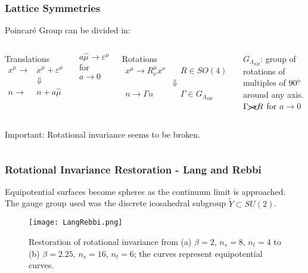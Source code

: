 \documentclass{beamer}
\begin{document}
\begin{frame}
  \frametitle{Lattice Symmetries}
  \centering
{}
  Poincaré Group can be divided in:
  \begin{columns}[t]
    \centering
    \begin{exampleblock}{\centering Translations}
      \vspace{-\baselineskip}
      \begin{align*}
        x^\mu \rightarrow& x^\mu+\varepsilon^\mu \\
        &\Downarrow \\
        n \rightarrow& n+a\hat\mu
      \end{align*}
    \end{exampleblock}
    \vspace{2.5\baselineskip}
    $a\hat\mu \rightarrow \varepsilon^\mu$ for $a\rightarrow0$
  
    \centering
{}
    \begin{exampleblock}{\centering Rotations}
      \vspace{-\baselineskip}
      \begin{align*}
        x^\mu \rightarrow R^\mu_\nu x^\nu &\quad R\in \mathit{SO}(4) \\
        &\Downarrow \\
        n \rightarrow \Gamma n &\quad \Gamma\in G_{\Lambda_{SH}}
      \end{align*}
    \end{exampleblock}
    $G_{\Lambda_{SH}}$: group of rotations of multiples of $90^\circ$ around any axis.\\
    \vspace{0.6\baselineskip}
    $\Gamma \xcancel{\rightarrow}R$ for $a\rightarrow0$
  \end{columns}
  \vspace{\baselineskip}
  \begin{columns}
    \begin{alertblock}{Important:}
      Rotational invariance seems to be broken.
    \end{alertblock}
  \end{columns}
\end{frame}

\begin{frame}
  \frametitle{Rotational Invariance Restoration - Lang and Rebbi}
  Equipotential surfaces become spheres as the continuum limit is approached\cite{Lang:1982tj}.\\
  The gauge group used was the discrete icosahedral subgroup $\tilde{Y}\subset\mathit{SU}(2)$.
  \begin{figure}
    \texttt{[image: LangRebbi.png]}
    \caption{Restoration of rotational invariance from (a) $\beta=2$, $n_s=8$, $n_t=4$ to (b) $\beta=2.25$, $n_s=16$, $n_t=6$; the curves represent equipotential curves.}
  \end{figure}
\end{frame}
\end{document}
